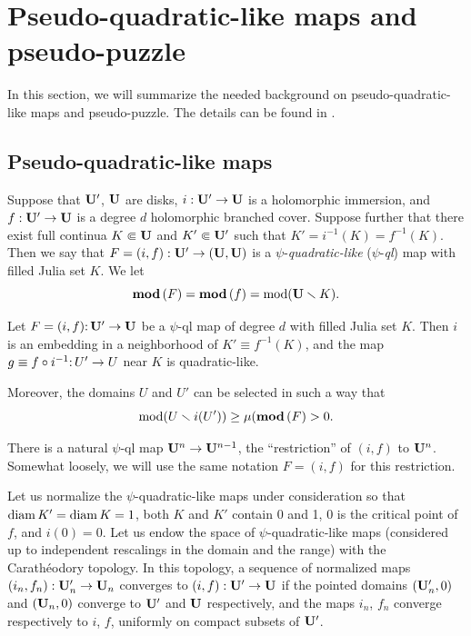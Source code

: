 
\section{Pseudo-quadratic-like maps and pseudo-puzzle}\label{pseudo-puzzle}

In this section, we will summarize the needed background on pseudo-quadratic-like maps
and pseudo-puzzle. The details can be found in \cite{K,decorations}. 

\subsection{Pseudo-quadratic-like maps}

Suppose that ${\mathbf{U}}'$, ${\mathbf{U}}$ are disks,
$i:  {\mathbf{U}}' \to {\mathbf{U}}$ is a holomorphic immersion,
and $f: {\mathbf{U}}' \to {\mathbf{U}}$ is a degree $d$ holomorphic branched cover.
Suppose further that there exist full continua $K \Subset {\mathbf{U}}$ and $K'\Subset {\mathbf{U}}'$
such that $K' = i^{-1}(K) = f^{-1}(K)$.
Then we say that $F=(i,f):  {\mathbf{U}}'\rightarrow ({\mathbf{U}}, {\mathbf{U}})$  is a  
$\psi$-{\it quadratic-like}
 ($\psi$-{\it ql}) map  with filled Julia set $K$.
We let
$$
   { \mathbf{mod}\, }(F)= { \mathbf{mod}\, }(f) = \operatorname{mod}({\mathbf{U}}\smallsetminus K). 
$$ 

\begin{lem}\label{ql extension}
Let $F=(i,f)\mathpunct:{\mathbf{U}}'\rightarrow {\mathbf{U}}$ be a $\psi$-ql map of degree $d$ 
 with filled Julia set $K$.
Then $i$ is an embedding in  a neighborhood of $K' \equiv f^{-1}(K)$, 
and the map  $g\equiv  f\circ i^{-1}\mathpunct: U'\rightarrow U$ near $K$ is quadratic-like.

\ssk Moreover, the domains $U$ and $U'$ can be selected in such a way that
$$ \operatorname{mod}(U\smallsetminus i(U'))\geq \mu ({ \mathbf{mod}\, }(F) >0.$$ 
\end{lem}

There is a natural $\psi$-ql map ${\mathbf{U}}^n\rightarrow {\mathbf{U}}^{n-1}$, 
the ``restriction'' of $(i,f)$ to ${\mathbf{U}}^n$. 
Somewhat loosely, we will use the same notation $F=(i,f)$ for this restriction.  

 Let us normalize  the $\psi$-quadratic-like  maps under consideration 
so that $\operatorname{diam} K'= \operatorname{diam} K=1$, both $K$ and $K'$ contain 0 and 1,  
$0$ is the critical point of $f$, and $i(0)=0$.
Let us endow the space of $\psi$-quadratic-like maps (considered up to independent rescalings in the domain and the range)
with the Carath\'eodory topology.
In this topology, a sequence of normalized maps $(i_n, f_n): {\mathbf{U}}_n'\rightarrow{\mathbf{U}}_n$ converges to $(i,f): {\mathbf{U}}'\rightarrow {\mathbf{U}}$ if
the pointed domains $({\mathbf{U}}_n', 0)$ and $({\mathbf{U}}_n, 0)$ converge to ${\mathbf{U}}'$ and ${\mathbf{U}}$ respectively,
and the maps $i_n$, $f_n$ converge respectively to $i$, $f$, 
uniformly on compact subsets of  ${\mathbf{U}}'$.  
  

